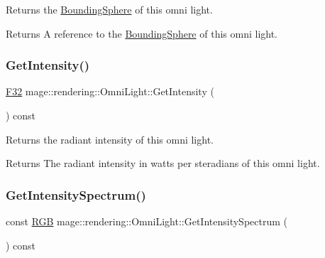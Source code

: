 Returns the \hyperlink{classmage_1_1_bounding_sphere}{Bounding\+Sphere} of this omni light.

\begin{DoxyReturn}{Returns}
A reference to the \hyperlink{classmage_1_1_bounding_sphere}{Bounding\+Sphere} of this omni light. 
\end{DoxyReturn}
\hypertarget{classmage_1_1rendering_1_1_omni_light_ada51f74cdcf61ff29049d0a1fdf973c9}{}\label{classmage_1_1rendering_1_1_omni_light_ada51f74cdcf61ff29049d0a1fdf973c9} 
\subsubsection{\texorpdfstring{Get\+Intensity()}{GetIntensity()}}
{\footnotesize\ttfamily \hyperlink{namespacemage_aa97e833b45f06d60a0a9c4fc22ae02c0}{F32} mage\+::rendering\+::\+Omni\+Light\+::\+Get\+Intensity (\begin{DoxyParamCaption}{ }\end{DoxyParamCaption}) const\hspace{0.3cm}{\ttfamily [noexcept]}}

Returns the radiant intensity of this omni light.

\begin{DoxyReturn}{Returns}
The radiant intensity in watts per steradians of this omni light. 
\end{DoxyReturn}
\hypertarget{classmage_1_1rendering_1_1_omni_light_a62247b6d7c2029ab906492049e858538}{}\label{classmage_1_1rendering_1_1_omni_light_a62247b6d7c2029ab906492049e858538} 
\subsubsection{\texorpdfstring{Get\+Intensity\+Spectrum()}{GetIntensitySpectrum()}}
{\footnotesize\ttfamily const \hyperlink{structmage_1_1_r_g_b}{R\+GB} mage\+::rendering\+::\+Omni\+Light\+::\+Get\+Intensity\+Spectrum (\begin{DoxyParamCaption}{ }\end{DoxyParamCaption}) const\hspace{0.3cm}{\ttfamily [noexcept]}}

